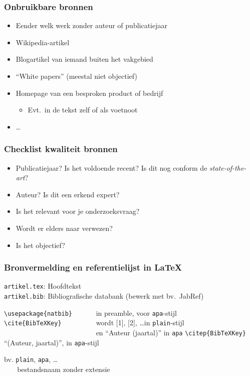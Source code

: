 \documentclass{beamer}
\begin{document}
\begin{frame}
  \frametitle{Onbruikbare bronnen}

  \begin{itemize}
    \item Eender welk werk zonder auteur of publicatiejaar
    \item Wikipedia-artikel
    \item Blogartikel van iemand buiten het vakgebied
    \item ``White papers'' (meestal niet objectief)
    \item Homepage van een besproken product of bedrijf
      \begin{itemize}
        \item Evt.~in de tekst zelf of als voetnoot
      \end{itemize}
    \item \dots
  \end{itemize}
\end{frame}

\begin{frame}
  \frametitle{Checklist kwaliteit bronnen}

  \begin{itemize}
    \item Publicatiejaar? Is het voldoende recent? Is dit nog conform de \emph{state-of-the-art}?
    \item Auteur? Is dit een erkend expert?
    \item Is het relevant voor je onderzoeksvraag?
    \item Wordt er elders naar verwezen?
    \item Is het objectief?
  \end{itemize}
\end{frame}

\begin{frame}[fragile]
  \frametitle{Bronvermelding en referentielijst in {\LaTeX}}

  \verb|artikel.tex|: Hoofdtekst\\
  \verb|artikel.bib|: Bibliografische databank (bewerk met bv.~JabRef)

  \vspace{18pt}

  \verb|\usepackage{natbib}      | in preamble, voor \texttt{apa}-stijl\\
  \verb|\cite{BibTeXKey}         | wordt [1], [2], \dots in \texttt{plain}-stijl\\
  \verb|                         |  en ``Auteur (jaartal)'' in \texttt{apa}
  \verb|\citep{BibTeXKey}        | ``(Auteur, jaartal)'', in \texttt{apa}-stijl\\

  \vspace{12pt}

  \verb|| bv. \texttt{plain}, \texttt{apa}, \dots\\
  \verb|   | bestandsnaam zonder extensie
\end{frame}
\end{document}
